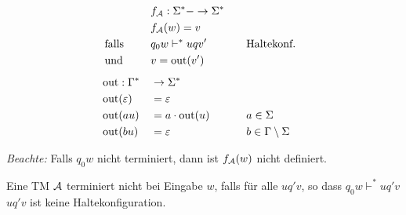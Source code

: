 \begin{Def} %
	\begin{alignat*}{3}
		&&&f_\A:\Sigma^*- \->\Sigma^*\\
		&&&f_\A(w)=v\\
		&\text{ falls } &&q_0w \vdash^*uqv'&\quad&\text{Haltekonf.}\\
		&\text{ und } &&v=\out( v')\\[.5em]
		&\out:\Gamma^* &&\-> \Sigma^*\\
		&\out(\Eps) &&= \Eps\\
		&\out(au) &&= a\cdot\out(u) &\quad& a\in\Sigma\\
		&\out(bu) &&= \Eps && b\in\Gamma\setminus\Sigma
	\end{alignat*}
\end{Def}
\emph{Beachte:} Falls $q_0 w$ nicht terminiert, dann ist $f_{\mathcal{A}}(w)$ nicht definiert.

Eine \ac{TM} $\mathcal{A}$ terminiert nicht bei Eingabe $w$, falls für alle $uq'v$, so dass $q_0w\vdash^*uq'v$\\
$uq'v$ ist keine Haltekonfiguration.

